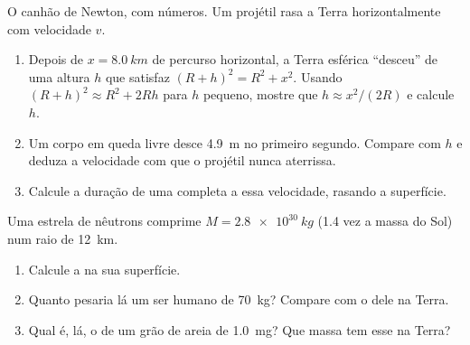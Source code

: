 \begin{exercise}[$\star\star\star$]\label{exo:g10:universal-gravitation:13}
O canhão de Newton, com números. Um projétil rasa a Terra
horizontalmente com velocidade $v$.
\begin{enumerate}
  \item Depois de $x = \qty{8.0}{km}$ de percurso horizontal, a Terra
        esférica ``desceu'' de uma altura $h$ que satisfaz
        $(R + h)^2 = R^2 + x^2$. Usando
        $(R + h)^2 \approx R^2 + 2Rh$ para $h$ pequeno, mostre que
        $h \approx x^2 / (2R)$ e calcule $h$.
  \item Um corpo em queda livre desce \qty{4.9}{m} no primeiro segundo.
        Compare com $h$ e deduza a velocidade com que o projétil nunca
        aterrissa.
  \item Calcule a duração de uma  completa a essa velocidade,
        rasando a superfície.
\end{enumerate}
\end{exercise}

\begin{exercise}[$\star\star\star$]\label{exo:g10:universal-gravitation:14}
Uma estrela de nêutrons comprime $M = \qty{2.8e30}{kg}$ (1.4 vez a massa
do Sol) num raio de \qty{12}{km}.
\begin{enumerate}
  \item Calcule a  na sua superfície.
  \item Quanto pesaria lá um ser humano de \qty{70}{kg}? Compare com o
         dele na Terra.
  \item Qual é, lá, o  de um grão de areia de \qty{1.0}{mg}? Que
        massa tem esse  na Terra?
\end{enumerate}
\end{exercise}

